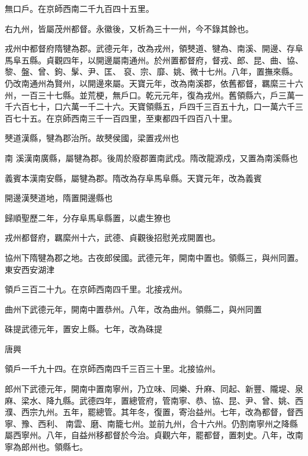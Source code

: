 \begin{pinyinscope}
 無口戶。在京師西南二千九百四十五里。



 右九州，皆屬茂州都督。永徽後，又析為三十一州，今不錄其餘也。



 戎州中都督府隋犍為郡。武德元年，改為戎州，領僰道、犍為、南溪、開邊、存阜馬阜五縣。貞觀四年，以開邊屬南通州。於州置都督府，督戎、郎、昆、曲、協、黎、盤、曾、鉤、髳、尹、匡、
 裒、宗、靡、姚、微十七州。八年，置撫來縣。仍改南通州為賢州，以開邊來屬。天寶元年，改為南溪郡，依舊都督，羈縻三十六州，一百三十七縣。並荒梗，無戶口。乾元元年，復為戎州。舊領縣六，戶三萬一千六百七十，口六萬一千二十六。天寶領縣五，戶四千三百五十九，口一萬六千三百七十五。在京師西南三千一百四里，至東都四千四百八十里。



 僰道漢縣，犍為郡治所。故僰侯國，梁置戎州也



 南
 溪漢南廣縣，屬犍為郡。後周於廢郡置南武戍。隋改龍源戍，又置為南溪縣也



 義賓本漢南安縣，屬犍為郡。隋改為存阜馬阜縣。天寶元年，改為義賓



 開邊漢僰道地，隋置開邊縣也



 歸順聖歷二年，分存阜馬阜縣置，以處生獠也



 戎州都督府，羈縻州十六，武德、貞觀後招慰羌戎開置也。



 協州下隋犍為郡之地。古夜郎侯國。武德元年，開南中置也。領縣三，與州同置。東安西安湖津



 領戶三百二十九。在京師西南四千里。北接戎州。



 曲州下武德元年，開南中置恭州。八年，改為曲州。領縣二，與州同置



 硃提武德元年，置安上縣。七年，改為硃提



 唐興



 領戶一千九十四。在京師西南四千三百三十里。北接協州。



 郎州下武德元年，開南中置南寧州，乃立味、同樂、升麻、同起、新豐、隴堤、泉麻、梁水、降九縣。武德四年，置總管府，管南寧、恭、協、昆、尹、曾、姚、西濮、西宗九州。五年，罷總管。其年冬，復置，寄治益州。七年，改為都督，督西寧、豫、西利、
 南雲、磨、南籠七州。並前九州，合十六州。仍割南寧州之降縣屬西寧州。八年，自益州移都督於今治。貞觀六年，罷都督，置刺史。八年，改南寧為郎州也。領縣七。




\end{pinyinscope}
